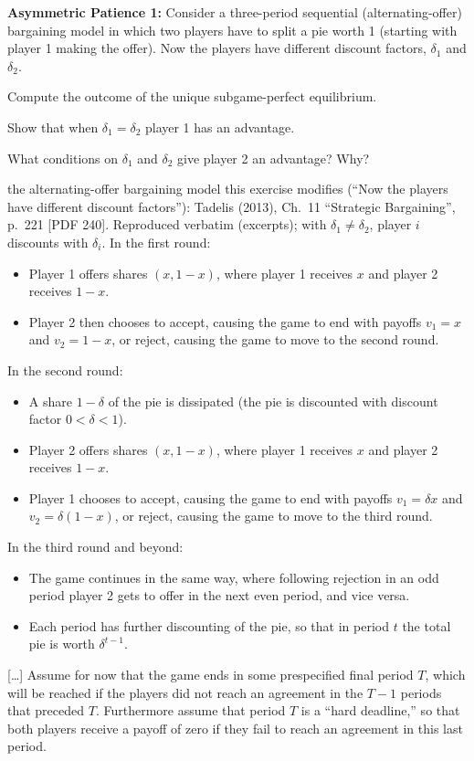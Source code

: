 \textbf{Asymmetric Patience 1:} Consider a three-period sequential (alternating-offer)
bargaining model in which two players have to split a pie worth 1 (starting with player 1 making
the offer). Now the players have different discount factors, $\delta_1$ and $\delta_2$.
\begin{partes}
\item Compute the outcome of the unique subgame-perfect equilibrium.
\item Show that when $\delta_1 = \delta_2$ player 1 has an advantage.
\item What conditions on $\delta_1$ and $\delta_2$ give player 2 an advantage? Why?
\end{partes}

\begin{referencia}{the alternating-offer bargaining model this exercise modifies (``Now the
players have different discount factors''): Tadelis (2013), Ch.~11 ``Strategic Bargaining'',
p.~221 [PDF 240]. Reproduced verbatim (excerpts); with $\delta_1 \neq \delta_2$, player $i$
discounts with $\delta_i$.}
In the first round:
\begin{itemize}[leftmargin=1.6em]
\item Player 1 offers shares $(x, 1 - x)$, where player 1 receives $x$ and player 2 receives $1 - x$.
\item Player 2 then chooses to accept, causing the game to end with payoffs $v_1 = x$ and
$v_2 = 1 - x$, or reject, causing the game to move to the second round.
\end{itemize}
In the second round:
\begin{itemize}[leftmargin=1.6em]
\item A share $1 - \delta$ of the pie is dissipated (the pie is discounted with discount factor
$0 < \delta < 1$).
\item Player 2 offers shares $(x, 1 - x)$, where player 1 receives $x$ and player 2 receives $1 - x$.
\item Player 1 chooses to accept, causing the game to end with payoffs $v_1 = \delta x$ and
$v_2 = \delta(1 - x)$, or reject, causing the game to move to the third round.
\end{itemize}
In the third round and beyond:
\begin{itemize}[leftmargin=1.6em]
\item The game continues in the same way, where following rejection in an odd period player 2 gets
to offer in the next even period, and vice versa.
\item Each period has further discounting of the pie, so that in period $t$ the total pie is worth
$\delta^{t-1}$.
\end{itemize}
[\ldots] Assume for now that the game ends in some prespecified final period $T$, which will be
reached if the players did not reach an agreement in the $T - 1$ periods that preceded $T$.
Furthermore assume that period $T$ is a ``hard deadline,'' so that both players receive a payoff of
zero if they fail to reach an agreement in this last period.
\end{referencia}
\resolespaco

